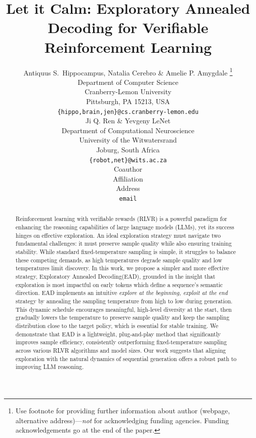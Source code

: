 \documentclass{article} %
\title{Let it Calm: Exploratory Annealed Decoding for Verifiable Reinforcement Learning}
\author{Antiquus S.~Hippocampus, Natalia Cerebro \& Amelie P. Amygdale \thanks{ Use footnote for providing further information
about author (webpage, alternative address)---\emph{not} for acknowledging
funding agencies.  Funding acknowledgements go at the end of the paper.} \\
Department of Computer Science\\
Cranberry-Lemon University\\
Pittsburgh, PA 15213, USA \\
\texttt{\{hippo,brain,jen\}@cs.cranberry-lemon.edu} \\
\And
Ji Q. Ren \& Yevgeny LeNet \\
Department of Computational Neuroscience \\
University of the Witwatersrand \\
Joburg, South Africa \\
\texttt{\{robot,net\}@wits.ac.za} \\
\AND
Coauthor \\
Affiliation \\
Address \\
\texttt{email}
}
\newcommand{\ych}[1]{\textcolor{purple}{[#1 -Chenghao]}}
\newcommand{\algname}{Exploratory Annealed Decoding\xspace}
\newcommand{\alg}{EAD\xspace}
\begin{document}
\maketitle

\begin{abstract}
Reinforcement learning with verifiable rewards (RLVR) is a powerful paradigm for enhancing the reasoning capabilities of large language models (LLMs), yet its success hinges on effective exploration. An ideal exploration strategy must navigate two fundamental challenges: it must preserve sample quality while also ensuring training stability. While standard fixed-temperature sampling is simple, it struggles to balance these competing demands, as high temperatures degrade sample quality and low temperatures limit discovery. In this work, we propose a simpler and more effective strategy, \algname (\alg), grounded in the insight that exploration is most impactful on early tokens which define a sequence's semantic direction. \alg implements an intuitive \textit{explore at the beginning, exploit at the end} strategy by annealing the sampling temperature from high to low during generation. 
%
This dynamic schedule encourages meaningful, high-level diversity at the start, then gradually lowers the temperature to preserve sample quality and keep the sampling distribution close to the target policy, which is essential for stable training. 
%
We demonstrate that \alg is a lightweight, plug-and-play method that significantly improves sample efficiency, consistently outperforming fixed-temperature sampling across various RLVR algorithms and model sizes. 
%
Our work suggests that aligning exploration with the natural dynamics of sequential generation offers a robust path to improving LLM reasoning.
%

\end{abstract}
\end{document}
